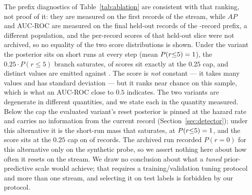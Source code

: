 \documentclass[manuscript,anonymous,review]{acmart}
\begin{document}
The prefix diagnostics of Table~\ref{tab:ablation} are consistent with that
ranking, not proof of it: they are measured on the first \SSixDiagWindowRows{}
records of the stream, while $AP$ and AUC-ROC are measured on the final
\SSixTestRows{} held-out records of the \SSixPrefixRows-record prefix, a
different population, and the per-record scores of that held-out slice were
not archived, so no equality of the two score distributions is shown. Under
the variant the posterior sits on
short runs at every step (mean $P(r{\le}5)=1$),
the $0.25\cdot P(r{\le}5)$ branch saturates, \SSixDiagCorrectedFracAtCap{} of
scores sit exactly at the $0.25$ cap, and \SSixDiagCorrectedDistinctScores{}
distinct values are emitted against \SSixDiagOriginalDistinctScores. The score
is \emph{not} constant --- it takes many values and has standard deviation
\SSixDiagCorrectedScoreSd{} --- but it ranks near chance on this sample, which
is what an AUC-ROC close to $0.5$ indicates. The two variants are degenerate in
different quantities, and we state each in the quantity measured. Below the cap
the evaluated variant's reset posterior is pinned at the hazard rate and
carries no information from the current record
(Section~\ref{sec:detector}); under this alternative it is the short-run mass
that saturates, at $P(r{\le}5)=1$, and the
score sits at the $0.25$ cap on \SSixDiagCorrectedFracAtCap{} of records. The
archived run recorded $P(r{=}0)$ for this alternative only on the synthetic
probe, so we assert nothing here about how often it resets on the stream. We
draw no conclusion about what a \emph{tuned}
prior-predictive scale would achieve; that requires a training/validation
tuning protocol and more than one stream, and selecting it on test labels is
forbidden by our protocol.
\end{document}
